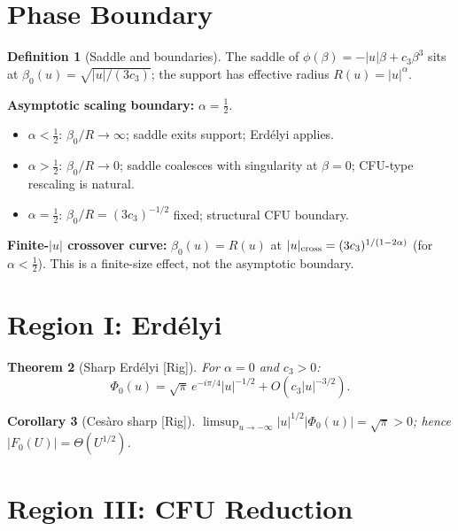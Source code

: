 \documentclass[12pt,a4paper]{amsart}
\newtheorem{theorem}{Theorem}[section]
\newtheorem{corollary}[theorem]{Corollary}
\theoremstyle{definition}
\newtheorem{definition}[theorem]{Definition}
\newcommand{\Rig}{\textup{[Rig]}}
\begin{document}
\section{Phase Boundary}
\label{sec:boundary}

\begin{definition}[Saddle and boundaries]
\label{def:boundary}
The saddle of $\phi(\beta)=-|u|\beta+c_3\beta^3$
sits at $\beta_0(u)=\sqrt{|u|/(3c_3)}$;
the support has effective radius $R(u)=|u|^\alpha$.

\medskip
\noindent\textbf{Asymptotic scaling boundary:}
$\alpha=\tfrac{1}{2}$.
\begin{itemize}
\item $\alpha<\tfrac{1}{2}$:
  $\beta_0/R\to\infty$;
  saddle exits support;
  Erd\'elyi applies.
\item $\alpha>\tfrac{1}{2}$:
  $\beta_0/R\to 0$;
  saddle coalesces with
  singularity at $\beta=0$;
  CFU-type rescaling is natural.
\item $\alpha=\tfrac{1}{2}$:
  $\beta_0/R=(3c_3)^{-1/2}$ fixed;
  structural CFU boundary.
\end{itemize}

\medskip
\noindent\textbf{Finite-$|u|$ crossover curve:}
$\beta_0(u)=R(u)$ at
$|u|_{\rm cross}=(3c_3)^{1/(1-2\alpha)}$
(for $\alpha<\tfrac{1}{2}$).
This is a finite-size effect,
not the asymptotic boundary.
\end{definition}

\section{Region I: Erd\'elyi}
\label{sec:erdelyi}

\begin{theorem}[Sharp Erd\'elyi \Rig]
\label{thm:erdelyi}
For $\alpha=0$ and $c_3>0$:
\[
  \Phi_0(u)
  =\sqrt{\pi}\,e^{-i\pi/4}
  |u|^{-1/2}+O(c_3|u|^{-3/2}).
\]
\end{theorem}

\begin{corollary}[Ces\`aro sharp \Rig]
$\limsup_{u\to-\infty}
|u|^{1/2}|\Phi_0(u)|
=\sqrt{\pi}>0$;
hence $|F_0(U)|=\Theta(U^{1/2})$.
\end{corollary}

\section{Region III: CFU Reduction}
\label{sec:cfu}
\end{document}
